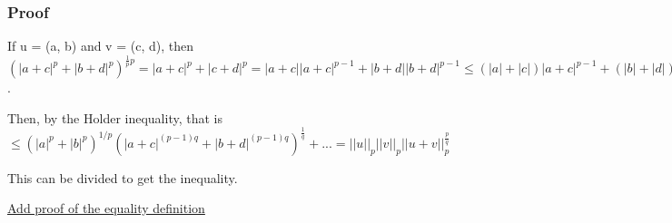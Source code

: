 \subsubsection{Proof}
If u = (a, b) and v = (c, d), then $(|a+c|^p + |b+d|^p)^{\frac{1}{p}p} = |a+c|^p + |c+d|^p = |a+c||a+c|^{p-1} + |b+d||b+d|^{p-1} \leq (|a| + |c|)|a+c|^{p-1} + (|b| + |d|)|b+d|^{p-1} = |a||a+c|^{p-1} + |b||b+d|^{p-1} + |c||a+c|^{p-1} + |d||b+d|^{p-1}$.

Then, by the Holder inequality, that is $\leq (|a|^p + |b|^p)^{1/p}(|a+c|^{(p-1)q} + |b+d|^{(p-1)q})^{\frac{1}{q}} + ... = ||u||_p||v||_p||u+v||_p^{\frac{p}{q}}$

This can be divided to get the inequality.

\underline{Add proof of the equality definition}
